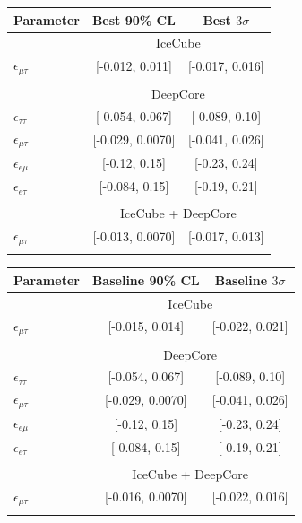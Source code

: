 \documentclass{article}
\newcommand{\emt}{\ensuremath{\epsilon_{\mu\tau}}}
\newcommand{\eet}{\epsilon_{e\tau}}
\newcommand{\eem}{\epsilon_{e\mu}}
\newcommand{\ett}{\ensuremath{\epsilon_{\tau\tau}}}
\begin{document}
{ {\renewcommand{\arraystretch}{1.0}
  \begin{table}
    \begin{center}
       \begin{tabular}{lcc}
          \hline
          Parameter & Best 90\% CL & Best $3\sigma$\\
          \hline & \multicolumn{2}{c}{IceCube}  \\
          $\emt$ &  [-0.012, 0.011] &  [-0.017, 0.016] \\\\
          & \multicolumn{2}{c}{DeepCore}\\ [0.3em]
          $\ett$ &  [-0.054, 0.067] &  [-0.089, 0.10] \\
          $\emt$ &  [-0.029, 0.0070] &  [-0.041, 0.026] \\
          $\eem$ &  [-0.12, 0.15] &  [-0.23, 0.24] \\
          $\eet$ &   [-0.084, 0.15] &  [-0.19, 0.21] \\\\
          &\multicolumn{2}{c}{IceCube + DeepCore} \\
          $\emt$ &  [-0.013, 0.0070] &  [-0.017, 0.013] \\
          \hline
          \vspace{2em}
       \end{tabular}
       \begin{tabular}{lcc}
          \hline
          Parameter & Baseline 90\% CL & Baseline $3\sigma$ \\
          \hline & \multicolumn{2}{c}{IceCube}  \\
          $\emt$ &  [-0.015, 0.014] &  [-0.022, 0.021] \\\\
          & \multicolumn{2}{c}{DeepCore}\\ [0.3em]
          $\ett$ &  [-0.054, 0.067] &  [-0.089, 0.10] \\
          $\emt$ &  [-0.029, 0.0070] &  [-0.041, 0.026] \\
          $\eem$ &  [-0.12, 0.15] &  [-0.23, 0.24] \\
          $\eet$ &   [-0.084, 0.15] &  [-0.19, 0.21] \\\\
          &\multicolumn{2}{c}{IceCube + DeepCore}\\
          $\emt$ &  [-0.016, 0.0070] &  [-0.022, 0.016] \\
          \hline
          \vspace{2em}

\end{tabular}
\end{center}
\end{table}}}
\end{document}
